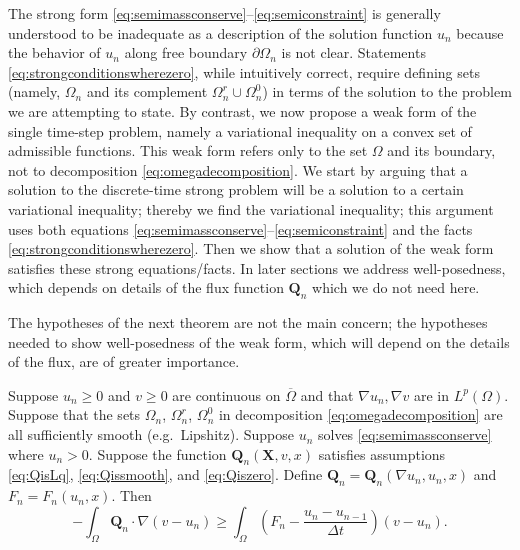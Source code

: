 \documentclass[final,leqno,onefignum,onetabnum]{siamltex1213bueler}
\newcommand\bQ{\mathbf{Q}}
\newcommand\bX{\mathbf{X}}
\renewcommand{\grad}{\nabla}
\begin{document}
The strong form \eqref{eq:semimassconserve}--\eqref{eq:semiconstraint} is generally understood to be inadequate as a description of the solution function $u_n$ because the behavior of $u_n$ along free boundary $\partial\Omega_n$ is not clear.  Statements \eqref{eq:strongconditionswherezero}, while intuitively correct, require defining sets (namely, $\Omega_n$ and its complement $\Omega_n^r \cup \Omega_n^0$) in terms of the solution to the problem we are attempting to state.  By contrast, we now propose a weak form of the single time-step problem, namely a variational inequality \cite{Friedman,KinderlehrerStampacchia} on a convex set of admissible functions.  This weak form refers only to the set $\Omega$ and its boundary, not to decomposition \eqref{eq:omegadecomposition}.  We start by arguing that a solution to the discrete-time strong problem will be a solution to a certain variational inequality; thereby we find the variational inequality; this argument uses both equations  \eqref{eq:semimassconserve}--\eqref{eq:semiconstraint} and the facts \eqref{eq:strongconditionswherezero}.  Then we show that a solution of the weak form satisfies these strong equations/facts.  In later sections we address well-posedness, which depends on details of the flux function $\bQ_n$ which we do not need here.

The hypotheses of the next theorem are not the main concern; the hypotheses needed to show well-posedness of the weak form, which will depend on the details of the flux, are of greater importance.

\medskip
\begin{theorem} \label{thm:strongimpliesweak} Suppose $u_n\ge 0$ and $v\ge 0$ are continuous on $\overline{\Omega}$ and that $\grad u_n,\grad v$ are in $L^p(\Omega)$.  Suppose that the sets $\Omega_n$, $\Omega_n^r$, $\Omega_n^0$ in decomposition \eqref{eq:omegadecomposition} are all sufficiently smooth (e.g.~Lipshitz).  Suppose $u_n$ solves \eqref{eq:semimassconserve} where $u_n>0$.  Suppose the function $\bQ_n(\bX,v,x)$ satisfies assumptions \eqref{eq:QisLq}, \eqref{eq:Qissmooth}, and \eqref{eq:Qiszero}.  Define $\bQ_n=\bQ_n(\grad u_n,u_n,x)$ and $F_n = F_n(u_n,x)$.  Then
\begin{equation}
-\int_{\Omega} \bQ_n \cdot \grad(v-u_n) \ge \int_{\Omega} \left(F_n - \frac{u_n - u_{n-1}}{\Delta t}\right) (v-u_n). \label{eq:morallytheVI}
\end{equation}
\end{theorem}
\end{document}
